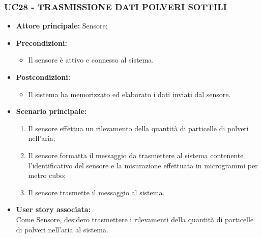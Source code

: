 \subsubsection{UC28 - TRASMISSIONE DATI POLVERI SOTTILI}
\begin{itemize}
    \item \textbf{Attore principale:} Sensore;
    \item \textbf{Precondizioni:}
        \begin{itemize}
            \item Il sensore è attivo e connesso al sistema. 
        \end{itemize}
    \item \textbf{Postcondizioni:}
        \begin{itemize}
            \item Il sistema ha memorizzato ed elaborato i dati inviati dal sensore.
        \end{itemize}
    \item \textbf{Scenario principale:}
        \begin{enumerate}
            \item Il sensore effettua un rilevamento della quantità di particelle di polveri nell'aria;
            \item Il sensore formatta il messaggio da trasmettere al sistema contenente l'identificativo del sensore e la misurazione effettuata in microgrammi per metro cubo;
            \item Il sensore trasmette il messaggio al sistema.
        \end{enumerate}
    \item \textbf{User story associata:} \\
    Come Sensore, desidero trasmettere i rilevamenti della quantità di particelle di polveri nell'aria al sistema.
\end{itemize}
